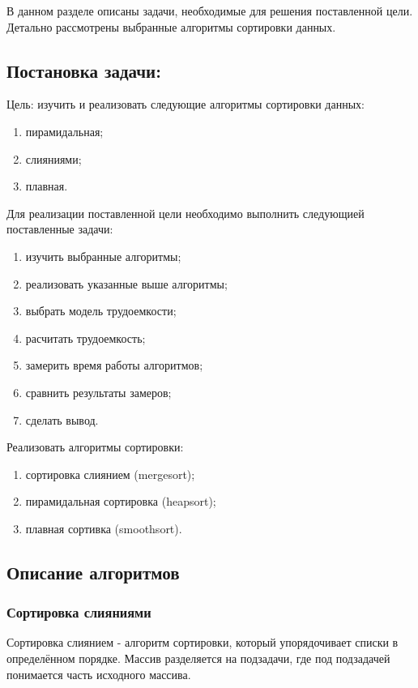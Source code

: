 \documentclass[12pt,a4paper]{scrartcl}
\begin{document}
		В данном разделе описаны задачи, необходимые для решения поставленной цели. Детально рассмотрены выбранные алгоритмы сортировки данных.
	
	\subsection{Постановка задачи:}
	
		Цель: изучить и реализовать следующие алгоритмы сортировки данных:
		\begin{enumerate}
			\item пирамидальная;
			\item слияниями;
			\item плавная.
		\end{enumerate}
	
		Для реализации поставленной цели необходимо выполнить следующией поставленные задачи:
		\begin{enumerate}
			\item изучить выбранные алгоритмы;
			\item реализовать указанные выше алгоритмы;
			\item выбрать модель трудоемкости;
			\item расчитать трудоемкость;
			\item замерить время работы алгоритмов; 
			\item сравнить результаты замеров;
			\item сделать вывод.
		\end{enumerate}
		
		Реализовать алгоритмы сортировки:
		\begin{enumerate}
			\item сортировка слиянием (mergesort);
			\item пирамидальная сортировка (heapsort);
			\item плавная сортивка (smoothsort).
		\end{enumerate}
	
		\subsection{Описание алгоритмов} 
		
		\subsubsection{Сортировка слияниями}

			Сортировка слиянием - алгоритм сортировки, который упорядочивает списки в определённом порядке. Массив разделяется на подзадачи, где под подзадачей понимается часть исходного массива. \cite{Beg}
			
\end{document}
